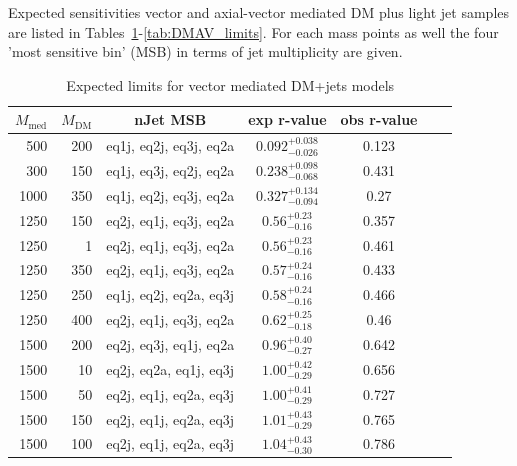 \clearpage


Expected sensitivities vector and axial-vector mediated DM plus light jet samples are listed in Tables~\ref{tab:DMV_limits}-\ref{tab:DMAV_limits}. For each mass points as well the four 'most sensitive bin' (MSB) in terms of jet multiplicity are given. 




\begin{table}
  \centering
  \begin{tabular}{rrccccc}
    \hline\hline
    $M_{\text{med}}$ & $M_{\text{DM}}$ & nJet MSB & exp r-value & obs r-value \\
    \hline
      500 & 200 & eq1j, eq2j, eq3j, eq2a & $0.092_{-0.026}^{+0.038}$ & 0.123 \\
      300 & 150 & eq1j, eq3j, eq2j, eq2a & $0.238_{-0.068}^{+0.098}$ & 0.431 \\
     1000 & 350 & eq1j, eq2j, eq3j, eq2a & $0.327_{-0.094}^{+0.134}$ & 0.27 \\
     1250 & 150 & eq2j, eq1j, eq3j, eq2a & $0.56_{-0.16}^{+0.23}$    & 0.357 \\
     1250 &   1 & eq2j, eq1j, eq3j, eq2a & $0.56_{-0.16}^{+0.23}$    & 0.461 \\
     1250 & 350 & eq2j, eq1j, eq3j, eq2a & $0.57_{-0.16}^{+0.24}$    & 0.433 \\
     1250 & 250 & eq1j, eq2j, eq2a, eq3j & $0.58_{-0.16}^{+0.24}$    & 0.466 \\
     1250 & 400 & eq2j, eq1j, eq3j, eq2a & $0.62_{-0.18}^{+0.25}$    & 0.46 \\
     1500 & 200 & eq2j, eq3j, eq1j, eq2a & $0.96_{-0.27}^{+0.40}$    & 0.642 \\
     1500 &  10 & eq2j, eq2a, eq1j, eq3j & $1.00_{-0.29}^{+0.42}$    & 0.656 \\
     1500 &  50 & eq2j, eq1j, eq2a, eq3j & $1.00_{-0.29}^{+0.41}$    & 0.727 \\
     1500 & 150 & eq2j, eq1j, eq2a, eq3j & $1.01_{-0.29}^{+0.43}$    & 0.765 \\
     1500 & 100 & eq2j, eq1j, eq2a, eq3j & $1.04_{-0.30}^{+0.43}$    & 0.786 \\
    \hline\hline
  \end{tabular}
  \caption{Expected limits for vector mediated DM+jets models}
  \label{tab:DMV_limits}
\end{table}

